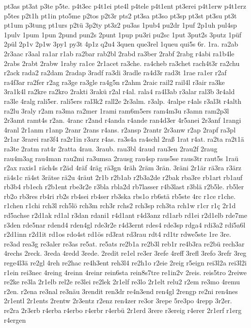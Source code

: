 {pt3as
pt3at
p3te
p5te.
p4t3ec
p4t1ei
pte4l
p4tele
p4t1ent
pt3erei
p4t1erw
p4t1erz
p5tes
p2t1h
pt1in
pto5me
p2tos
p2t3r
pts2
pt3sa
pt3so
pt3sp
pt3st
pt3su
pt3t
pt1um
p3tung
pt1urs
p2tü
3p2ty
pt3z2
pu3as
1pub4
pu2dr
1puf
2p1uh
pul4sp
1pulv
1pum
1pun
2pund
pun2s
2punt
1pup
pu3ri
pu2sc
1put
3put2s
3putz
1püf
2pül
2p1v
2p1w
3py1
py3t
4p1z
q2u4
3quen
que3rel
1queu
qui5s
6r.
1ra.
ra2ab
2r3aac
r3aal
ra1ar
r1ab
ra2bar
rab2bl
2rabd
ra3ber
2rabf
2rabg
r4abi
ra1b4le
2rabs
2rabt
2rabw
1raby
ra1ce
2r1acet
ra3che.
ra4cheb
ra3chet
rach4t3r
ra2chu
r2ack
rada2
ra2dam
2radap
3radf
ra3di
3radle
ra4d3r
rad3t
1rae
ra1er
r2af
ra4f3ar
ra2fer
r2ag
ra3ge
ra3gle
ra4g5n
r2ahm
2raic
rail2
rail4l
r3air
ra3ke
3ra1k4l
ra2kre
ra2kro
2rakti
3rakü
r2al
r4al.
rala4
ra4l3ab
r3alar
ral3b
3r4ald
ra3le
4ralg
rali5er.
rali5ers
ral3k2
rall2e
2r3alm.
r3alp.
4ralpe
r4als
r3al3t
r4alth
ra2lu
3raly
r2am
ra3ma
ra2mer
1rami
ram6m5ers
ram4m3u
r3amn
ram2p3l
2r3amt
ramt4s
r2an.
4ranc
r2and
r4anda
r4ande
ran4d3er
4r5anei
2r3anf
1rangi
4ranl
2r1anm
r1anp
2ranr
2rans
r4ans.
r2ansp
2rantr
2r3anw
r2ap
2rapf
ra3pl
2r1ar
3rarei
rar3f4
ra2r1in
r3arz
r4as.
ra3s4a
ra4schl
2raß
1rat
r4at.
ra2ta
ra2t1ä
ra3te
2ratm
rat4r
2ratta
4rau.
3raub.
rau3bl
4raud
rau3en
2rau2f
2raug
rau4m3ag
rau4man
rau2mi
ra3umsa
2rausg
rau4sp
raus5se
raus3tr
raut5s
1raü
r2ax
raxis1
räch4s
r2äd
4räf
4räg
rä3gn
4räh
2räm
3rän.
3räni
2r1är
rä3ra
r3ärz
rä4s1c
rä4st
3rätse
rä2u
4räut
2r1b
r2b1ab
r2b3a2de
r2bak
rba3re
rb1art
rb1auf
rb3b4
rb1ech
r2b1ent
rbe3r2e
r3bla
rbla2d
rb7lasser
r4b3last
r3blä
r2b5le.
rb5ler
rb2o
rb3res
rb4ri
rb2s
rb4sei
rb4ser
rb3ska
rbs1o
rb6stä
rb5ste
4rc
r1ce
r1che.
r1chen
r1chi
rch3l
rch5lö
rch3m
rch3r
rchs2
rch3sp
rch3ta
rch1w
r1cr
r1ç
2r1d
rd5achse
r2d1ak
rd1al
r3dan
rdani1
r4d1ant
r4d3anz
rd1arb
rd1ei
r2d1elb
rde7me
r3den
rde5nar
rdend4
rden4gl
rde3r2e
r4d3ernt
rdes4
rde3sp
rdga4
rdi3a2
rdi5a6l
r2d1inn
r2d1it
rd1os
rdo4st
rd1ös
rd3rat
rd3rau
rdt4
rd1tr
rdwe5ste
1re
3re.
re3ad
rea3g
re3aler
re3as
re5at.
re5ats
re2b1a
re2b3l
reb1r
re4b3ra
re2bü
rech3ar
4rechs
2reck.
3reda
4redd
3rede.
2redit
re1el
re3er
3refe
4reff
3refl
3refo
3refr
3reg
rege4l3ä
re2gl
4reh
re2hac
re4h3ent
reh3l4
re2h1o
r2eie
2reig
r5eign
rei3l2a
rei3l2i
r1ein
rei3nec
4reing
4reinn
4reinr
rein6sta
rein8s7tre
re1in2v
2reis.
reis5tro
2reiwe
re2ke
re3la
2r1elb
rel2e
re3lei
re2lek
2r1elf
re3lo
2r1elt
relu2
r2em
re3mo
4remu
r2en.
r2ena
re3nal
re3näu
3rendit
ren3dr
re4n3end
ren4gl
2rengp
re2ni
ren4nes
2r1entl
2r1ents
2rentw
2r3entz
r2enz
ren4zer
re3or
3repe
5re3po
4repp
3r2er.
re2ra
2r3erb
r4erba
r4erbo
r4erbr
r4erbü
2r1erd
3rere
r3ereig
r4erer
2r1erf
r1erg
r4ergen
}
